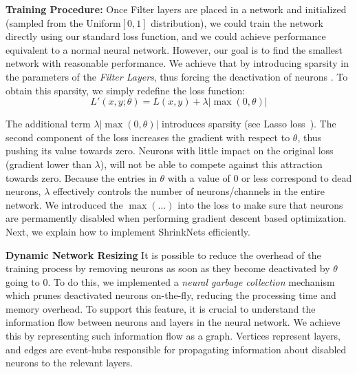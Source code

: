 \documentclass[sigconf]{acmart}
\newcommand{\gl}[1]{\textcolor{violet}{{\bf Gl:} #1}}
\begin{document}
\textbf{Training Procedure: } Once Filter layers are placed in a network and initialized (sampled from the Uniform$[0, 1]$ distribution),
we could train the network directly using our standard loss function, and we could achieve performance equivalent to a normal neural
network. However, our goal is to find the smallest network with reasonable
performance. We achieve that by introducing sparsity in the parameters of the
\textit{Filter Layers}, thus forcing the deactivation of neurons%
. To obtain this sparsity, we simply redefine the loss function:
\vspace{-.5em}
\begin{equation}
  L'(x,y;\theta) = L(x, y) + \lambda|\max(0, \theta)|
\end{equation}

The additional term $\lambda|\max(0, \theta)|$ introduces sparsity (see Lasso
loss~\cite{Tibshirani1996}). 
 The second component of the loss increases the gradient with respect to $\theta$, thus pushing its value towards zero. Neurons with little impact
on the original loss (gradient lower than $\lambda$), will not be able to
compete against this attraction towards zero. Because the entries in $\theta$
with a value of $0$ or less correspond to dead neurons, $\lambda$ effectively
controls the number of neurons/channels in the entire network. We introduced
the $\max(\dots)$ into the loss to make sure that neurons are permamently disabled
when performing gradient descent based optimization. Next, we
explain how to implement ShrinkNets efficiently.

\textbf{Dynamic Network Resizing}
It is possible to reduce the overhead of the training process by removing
neurons as soon as they become deactivated by $\theta$ going to 0.
To do this, we implemented a \emph{neural garbage collection} mechanism which
prunes deactivated neurons on-the-fly,  reducing the processing time
and memory overhead. To support this feature, it is crucial to understand the
information flow between neurons and layers in the neural network. We achieve
this by representing such information flow as a graph. Vertices represent layers,
and edges are event-hubs responsible for propagating information about disabled
neurons to the relevant layers.
\end{document}
